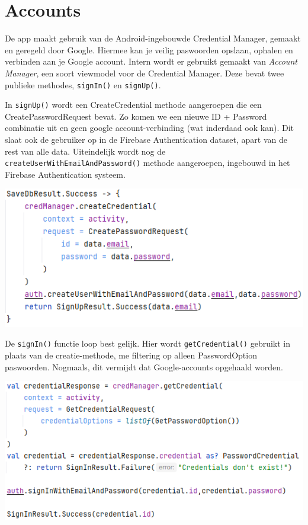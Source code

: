 \documentclass{report}
\begin{document}
\section{Accounts}
De app maakt gebruik van de Android-ingebouwde Credential Manager, gemaakt en geregeld door Google.
Hiermee kan je veilig paswoorden opslaan, ophalen en verbinden aan je Google account.
Intern wordt er gebruikt gemaakt van \textit{Account Manager}, een soort viewmodel voor de Credential Manager.
Deze bevat twee publieke methodes, \verb|signIn()| en \verb|signUp()|.

In \verb|signUp()| wordt een CreateCredential methode aangeroepen die een CreatePasswordRequest bevat.
Zo komen we een nieuwe ID + Password combinatie uit en geen google account-verbinding (wat inderdaad ook kan).
Dit slaat ook de gebruiker op in de Firebase Authentication dataset, apart van de rest van alle data.
Uiteindelijk wordt nog de \verb|createUserWithEmailAndPassword()| methode aangeroepen, ingebouwd in het Firebase Authentication systeem.
\begin{center}
    \includegraphics{ACC_Create}
\end{center}

De \verb|signIn()| functie loop best gelijk.
Hier wordt \verb|getCredential()| gebruikt in plaats van de creatie-methode, me filtering op alleen PasswordOption paswoorden.
Nogmaals, dit vermijdt dat Google-accounts opgehaald worden.

\begin{center}
    \includegraphics{ACC_Get}
\end{center}
\end{document}

